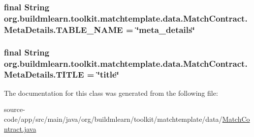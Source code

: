 \subsubsection[{\texorpdfstring{T\+A\+B\+L\+E\+\_\+\+N\+A\+ME}{TABLE_NAME}}]{\setlength{\rightskip}{0pt plus 5cm}final String org.\+buildmlearn.\+toolkit.\+matchtemplate.\+data.\+Match\+Contract.\+Meta\+Details.\+T\+A\+B\+L\+E\+\_\+\+N\+A\+ME = \char`\"{}meta\+\_\+details\char`\"{}\hspace{0.3cm}{\ttfamily [static]}}\hypertarget{classorg_1_1buildmlearn_1_1toolkit_1_1matchtemplate_1_1data_1_1MatchContract_1_1MetaDetails_a12cf1511f7cc5ef964c61dcf490b8f9f}{}\label{classorg_1_1buildmlearn_1_1toolkit_1_1matchtemplate_1_1data_1_1MatchContract_1_1MetaDetails_a12cf1511f7cc5ef964c61dcf490b8f9f}
\subsubsection[{\texorpdfstring{T\+I\+T\+LE}{TITLE}}]{\setlength{\rightskip}{0pt plus 5cm}final String org.\+buildmlearn.\+toolkit.\+matchtemplate.\+data.\+Match\+Contract.\+Meta\+Details.\+T\+I\+T\+LE = \char`\"{}title\char`\"{}\hspace{0.3cm}{\ttfamily [static]}}\hypertarget{classorg_1_1buildmlearn_1_1toolkit_1_1matchtemplate_1_1data_1_1MatchContract_1_1MetaDetails_a0f29454366bb795f4f75d9a977bba610}{}\label{classorg_1_1buildmlearn_1_1toolkit_1_1matchtemplate_1_1data_1_1MatchContract_1_1MetaDetails_a0f29454366bb795f4f75d9a977bba610}


The documentation for this class was generated from the following file\+:\begin{DoxyCompactItemize}
\item 
source-\/code/app/src/main/java/org/buildmlearn/toolkit/matchtemplate/data/\hyperlink{MatchContract_8java}{Match\+Contract.\+java}\end{DoxyCompactItemize}
